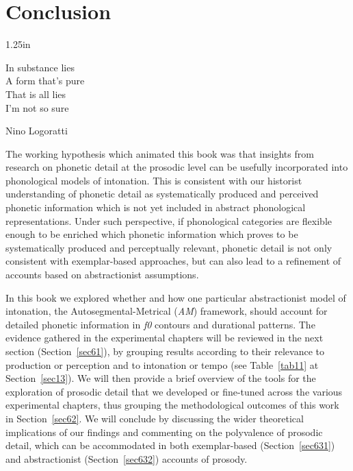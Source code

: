 \chapter{Conclusion}\label{sec6}
\epigraph{1.25in}{In substance lies\\A form that's pure\\That is all lies\\I'm not so sure}{Nino Logoratti}{}

The working hypothesis which animated this book was that insights from research on phonetic detail at the prosodic level can be usefully incorporated into phonological models of intonation. This is consistent with our historist understanding of phonetic detail as systematically produced and perceived phonetic information which is not yet included in abstract phonological representations. Under such perspective, if phonological categories are flexible enough to be enriched which phonetic information which proves to be systematically produced and perceptually relevant, phonetic detail is not only consistent with exemplar-based approaches, but can also lead to a refinement of accounts based on abstractionist assumptions. 

In this book we explored whether and how one particular abstractionist model of intonation, the Autosegmental-Metrical (\textit{AM}) framework, should account for detailed phonetic information in \textit{f0} contours and durational patterns. The evidence gathered in the experimental chapters will be reviewed in the next section (Section~\ref{sec61}), by grouping results according to their relevance to production or perception and to intonation or tempo (see Table~\ref{tab11} at Section~\ref{sec13}). We will then provide a brief overview of the tools for the exploration of prosodic detail that we developed or fine-tuned across the various experimental chapters, thus grouping the methodological outcomes of this work in Section~\ref{sec62}. We will conclude by discussing the wider theoretical implications of our findings and commenting on the polyvalence of prosodic detail, which can be accommodated in both exemplar-based (Section~\ref{sec631}) and abstractionist (Section~\ref{sec632}) accounts of prosody.

